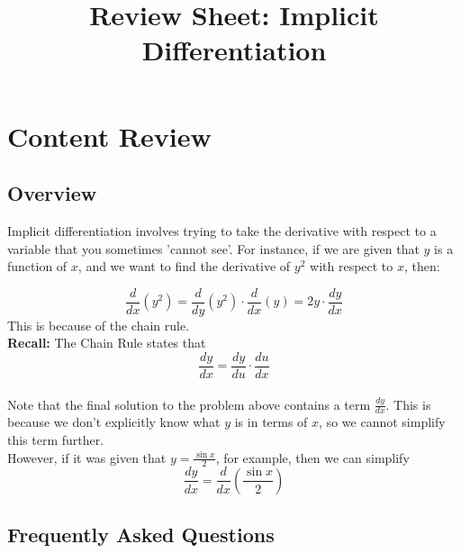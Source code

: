 \documentclass{article}
\title{Review Sheet: Implicit Differentiation}
\date{}
\author{}
\begin{document}
\maketitle
\vspace{-0.75in}
\section*{Content Review}
\subsection*{Overview}

Implicit differentiation involves trying to take the derivative with respect to a variable that you sometimes 'cannot see'. For instance, if we are given that $y$ is a function of $x$, and we want to find the derivative of $y^2$ with respect to $x$, then:

$$\frac{d}{dx}(y^2) = \frac{d}{dy}(y^2)\cdot \frac{d}{dx}(y) = 2y \cdot \frac{dy}{dx}$$
This is because of the chain rule. 
\\
\textbf{Recall:} The Chain Rule states that
$$\frac{dy}{dx} = \frac{dy}{du}\cdot \frac{du}{dx}$$
\\
Note that the final solution to the problem above contains a term $\frac{dy}{dx}$. This is because we don't explicitly know what $y$ is in terms of $x$, so we cannot simplify this term further. 
\\
However, if it was given that $y = \frac{\sin x}{2}$, for example, then we can simplify $$\frac{dy}{dx} = \frac{d}{dx}\left(\frac{\sin x}{2}\right)$$

\subsection*{Frequently Asked Questions}
\end{document}
